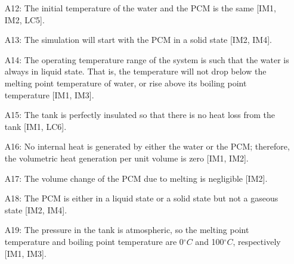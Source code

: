 \documentclass[12pt]{article}
\begin{document}
\begin{itemize}
\item[A12:]The initial temperature of the water and the PCM is the same [IM1, IM2, LC5].
\item[A13:]The simulation will start with the PCM in a solid state [IM2, IM4].
\item[A14:]The operating temperature range of the system is such that the water is always in liquid state. That is, the temperature will not drop below the melting point temperature of water, or rise above its boiling point temperature [IM1, IM3].
\item[A15:]The tank is perfectly insulated so that there is no heat loss from the tank [IM1, LC6].
\item[A16:]No internal heat is generated by either the water or the PCM; therefore, the volumetric heat generation per unit volume is zero [IM1, IM2].
\item[A17:]The volume change of the PCM due to melting is negligible [IM2].
\item[A18:]The PCM is either in a liquid state or a solid state but not a gaseous state [IM2, IM4].
\item[A19:]The pressure in the tank is atmospheric, so the melting point temperature and boiling point temperature are 0${}^{\circ}C$ and 100${}^{\circ}C$, respectively [IM1, IM3].
\end{itemize}
\end{document}
